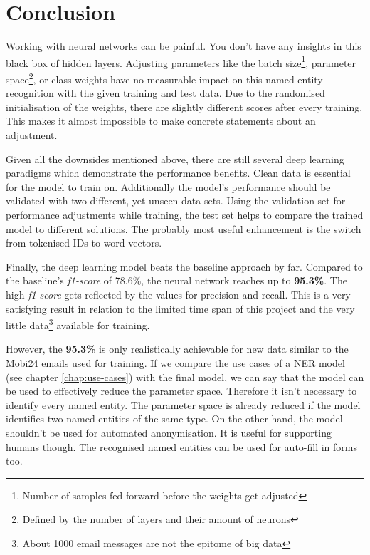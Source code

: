 \section{Conclusion}

Working with neural networks can be painful. You don't have any insights in this black box of hidden layers. Adjusting parameters like the batch size\footnote{Number of samples fed forward before the weights get adjusted}, parameter space\footnote{Defined by the number of layers and their amount of neurons}, or class weights have no measurable impact on this named-entity recognition with the given training and test data. Due to the randomised initialisation of the weights, there are slightly different scores after every training. This makes it almost impossible to make concrete statements about an adjustment.

Given all the downsides mentioned above, there are still several deep learning paradigms which demonstrate the performance benefits. Clean data is essential for the model to train on. Additionally the model's performance should be validated with two different, yet unseen data sets. Using the validation set for performance adjustments while training, the test set helps to compare the trained model to different solutions. The probably most useful enhancement is the switch from tokenised IDs to word vectors.

Finally, the deep learning model beats the baseline approach by far. Compared to the baseline's \emph{f1-score} of 78.6\%, the neural network reaches up to \textbf{95.3\%}. The high \emph{f1-score} gets reflected by the values for precision and recall. This is a very satisfying result in relation to the limited time span of this project and the very little data\footnote{About 1000 email messages are not the epitome of big data} available for training.

However, the \textbf{95.3\%} is only realistically achievable for new data similar to the Mobi24 emails used for training. If we compare the use cases of a NER model (see chapter \ref{chap:use-cases}) with the final model, we can say that the model can be used to effectively reduce the parameter space. Therefore it isn't necessary to identify every named entity. The parameter space is already reduced if the model identifies two named-entities of the same type. On the other hand, the model shouldn't be used for automated anonymisation. It is useful for supporting humans though. The recognised named entities can be used for auto-fill in forms too.
